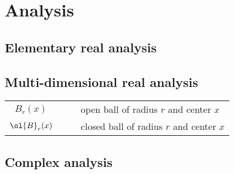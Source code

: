 
\section{Analysis}


\subsection{Elementary real analysis}


\subsection{Multi-dimensional real analysis}

\begin{center}
\begin{longtable}{ccl}
\hline
$B_r(x)$ & $\quad$ & open ball of radius $r$ and center $x$ \\
$\ol{B}_r(x)$ & $\quad$ & closed ball of radius $r$ and center $x$ \\
\hline
\end{longtable}
\end{center}

\subsection{Complex analysis}

